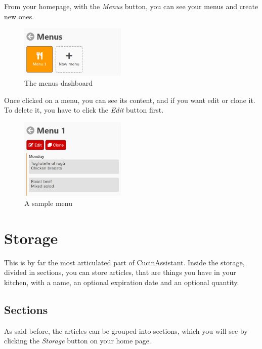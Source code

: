 \documentclass[12pt, a4paper]{report}
\begin{document}
    From your homepage, with the \emph{Menus} button, you can see your menus and create new ones.

    \begin{figure}[H]
        \centering
        \includegraphics[width=0.45\textwidth]{assets/en/menus.png}
        \caption{The menus dashboard}
    \end{figure}

    Once clicked on a menu, you can see its content, and if you want edit or clone it. To delete it, you have to
    click the \emph{Edit} button first.

    \begin{figure}[H]
        \centering
        \includegraphics[width=0.45\textwidth]{assets/en/menu.png}
        \caption{A sample menu}
    \end{figure}



    \chapter{Storage}

    This is by far the most articulated part of CucinAssistant.
    Inside the storage, divided in sections, you can store articles, that are things you have in your kitchen, with a name,
    an optional expiration date and an optional quantity.

    \section{Sections}

    As said before, the articles can be grouped into sections, which you will see by clicking the \emph{Storage} button on
    your home page.
\end{document}
